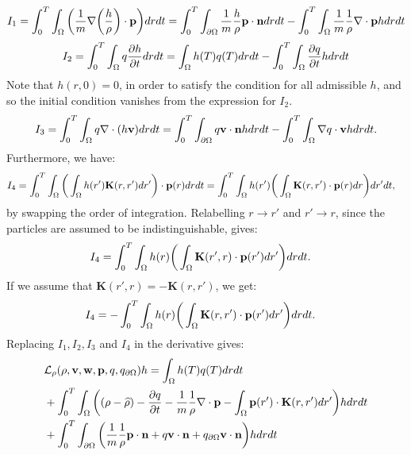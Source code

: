 \begin{align*}
I_1 = \int_0^T \int_\Omega \bigg( \frac{1}{m}\nabla \bigg(\frac{h}{\rho}\bigg)\cdot \mathbf{p} \bigg)  dr dt  = \int_0^T \int_{\partial \Omega} \frac{1}{m} \frac{h}{\rho} \mathbf{p} \cdot \mathbf{n} dr dt - \int_0^T \int_\Omega \frac{1}{m} \frac{1}{\rho}\nabla \cdot \mathbf{p} h dr dt 
\end{align*}
\begin{align*}
I_2 = \int_0^T \int_\Omega q\frac{\partial h}{\partial t} dr dt = \int_\Omega h(T) q(T) dr dt - \int_0^T \int_\Omega  \frac{\partial q}{\partial t}h dr dt
\end{align*}
Note that ${h}(r,0)=0$, in order to satisfy the condition for all admissible ${h}$, and so the initial condition vanishes from the expression for $I_2$.
\begin{align*}
I_3= \int_0^T \int_\Omega q\nabla \cdot (h \mathbf{v}) dr dt = \int_0^T \int_{\partial \Omega} q \mathbf{v} \cdot \mathbf{n} h dr dt - \int_0^T \int_\Omega \nabla q \cdot \mathbf{v} h dr dt.
\end{align*}
Furthermore, we have:
\begin{align*}
I_{4}&= \int_0^T \int_\Omega \bigg(\int_\Omega  h(r') \mathbf{K}(r,r')dr'\bigg) \cdot \mathbf{p}(r) drdt=\int_0^T \int_\Omega  h(r')\bigg(\int_\Omega  \mathbf{K}(r,r')\cdot \mathbf{p}(r) dr \bigg)dr'dt,
\end{align*}
by swapping the order of integration. 
Relabelling $r \to r'$ and $r' \to r$, since the particles are assumed to be indistinguishable, gives:
\begin{align*}
I_{4}&= \int_0^T \int_\Omega  h(r)\bigg(\int_\Omega  \mathbf{K}(r',r) \cdot \mathbf{p}(r') dr' \bigg)drdt.
\end{align*}
If we assume that $\mathbf{K}(r',r) = - \mathbf{K}(r,r')$, we get:
\begin{align*}
I_{4}&= -\int_0^T \int_\Omega  h(r)\bigg(\int_\Omega  \mathbf{K}(r,r') \cdot \mathbf{p}(r') dr' \bigg)drdt.
\end{align*}
Replacing $I_1, I_2, I_3$ and $I_4$ in the derivative gives:
\begin{align*}
&\mathcal{L}_\rho(\rho,\mathbf{v},\mathbf{w},\mathbf{p},q,{q}_{\partial \Omega})h = \int_\Omega h(T) q(T) dr dt  \\
&+ \int_0^T \int_\Omega \bigg( (\rho - \widehat {\rho}) - \frac{\partial q}{\partial t} -\frac{1}{m} \frac{1}{\rho}\nabla \cdot \mathbf{p} -  \int_\Omega  \mathbf{p}(r') \cdot\mathbf{K}(r,r')   dr'  \bigg)hdr dt\\
&+\int_0^T \int_{\partial \Omega} \bigg( \frac{1}{m} \frac{1}{\rho} \mathbf{p} \cdot \mathbf{n} + q \mathbf{v} \cdot \mathbf{n}   +{q}_{\partial \Omega} \mathbf{v} \cdot \mathbf{n}\bigg)h  dr dt
\end{align*}
